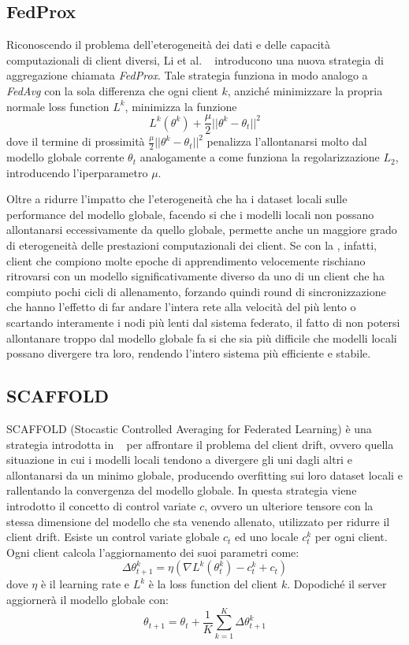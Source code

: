 \subsection{FedProx}
Riconoscendo il problema dell'eterogeneità dei dati e delle capacità 
computazionali di client diversi, Li et al. ~\cite{li2018FederatedOI}
introducono una nuova strategia di aggregazione chiamata 
\textit{FedProx}. Tale strategia funziona in modo analogo a 
\textit{FedAvg} con la sola differenza che ogni client \(k\), anziché 
minimizzare la propria normale loss function \(L^k\), minimizza la 
funzione
\[
L^k(\theta^k) + \frac{\mu}{2} ||\theta^k - \theta_t||^2
\]
dove il termine di prossimità \(\frac{\mu}{2} ||\theta^k - \theta_t||^2\) 
penalizza l'allontanarsi molto dal modello globale corrente
\(\theta_t\) analogamente a come funziona la regolarizzazione \(L_2\),
introducendo l'iperparametro \(\mu\).

Oltre a ridurre l'impatto che l'eterogeneità che ha i dataset locali 
sulle performance del modello globale, facendo si che i modelli locali 
non possano allontanarsi eccessivamente da quello globale, permette 
anche un maggiore grado di eterogeneità delle prestazioni computazionali 
dei client. Se con la , infatti, client che compiono 
molte epoche di apprendimento velocemente rischiano ritrovarsi con un 
modello significativamente diverso da uno di un client che ha compiuto
pochi cicli di allenamento, forzando quindi round di sincronizzazione
che hanno l'effetto di far andare l'intera rete alla velocità del più
lento o scartando interamente i nodi più lenti dal sistema federato, 
il fatto di non potersi allontanare troppo dal modello globale fa si
che sia più difficile che modelli locali possano divergere tra loro,
rendendo l'intero sistema più efficiente e stabile.


\subsection{SCAFFOLD}
SCAFFOLD (Stocastic Controlled Averaging for Federated Learning) è una 
strategia introdotta in ~\cite{Karimireddy2020scaffold} per 
affrontare il problema del client drift, ovvero quella situazione in 
cui i modelli locali tendono a divergere gli uni dagli altri e allontanarsi 
da un minimo globale, producendo overfitting sui loro dataset locali 
e rallentando la convergenza del modello globale.
In questa strategia viene introdotto il concetto di control variate
\(c\), ovvero un ulteriore tensore con la stessa dimensione del modello 
che sta venendo allenato, utilizzato per ridurre il client drift. 
Esiste un control variate globale \(c_t\) ed uno locale \(c_t^k\) per 
ogni client. Ogni client calcola l'aggiornamento dei suoi parametri come:
\[
\Delta\theta_{t+1}^k = \eta (\nabla L^k(\theta_t^k) -c_t^k +c_t)
\]
dove \(\eta\) è il learning rate e \(L^k\) è la loss function del 
client \(k\). Dopodiché il server aggiornerà il modello globale con:
\[
\theta_{t+1} = \theta_t + \frac{1}{K} \sum_{k=1}^{K} \Delta\theta_{t+1}^k
\]

